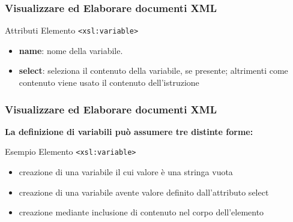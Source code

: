 \begin{frame}
    \frametitle{Visualizzare ed Elaborare documenti XML}
    \addtocounter{nframe}{1}
    

     \begin{block}{Attributi Elemento \texttt{<xsl:variable>}}
         \begin{itemize}
             \item \textbf{name}: nome della variabile.
             \item \textbf{select}: seleziona il contenuto della variabile, se presente; altrimenti come contenuto viene usato il contenuto dell’istruzione 
        \end{itemize}
     \end{block}
    
\end{frame}

\begin{frame}
    \frametitle{Visualizzare ed Elaborare documenti XML}
    \addtocounter{nframe}{1}
    
    \textbf{La definizione di variabili può assumere tre distinte forme:}

     \begin{block}{Esempio Elemento \texttt{<xsl:variable>}}
        \begin{itemize}
            \item creazione di una variabile il cui valore è una stringa vuota
            \item creazione di una variabile avente valore definito dall’attributo select
            \item creazione mediante inclusione di contenuto nel corpo dell’elemento
        \end{itemize}
     \end{block}
\end{frame}

